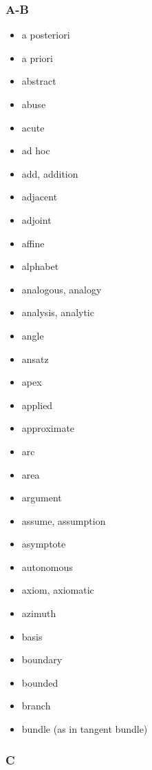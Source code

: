 \documentclass[12pt]{article}
\begin{document}

\subsubsection*{A-B}

\begin{multicols}{3}{
\begin{itemize}
\item a posteriori
\item a priori
\item abstract
\item abuse
\item acute
\item ad hoc
\item add, addition
\item adjacent
\item adjoint
\item affine
\item alphabet
\item analogous, analogy
\item analysis, analytic
\item angle
\item ansatz
\item apex
\item applied
\item approximate
\item arc
\item area
\item argument
\item assume, assumption
\item asymptote
\item autonomous
\item axiom, axiomatic
\item azimuth
\item basis
\item boundary
\item bounded
\item branch
\item bundle (as in tangent bundle)
\end{itemize}
}
\end{multicols}

\subsubsection*{C}
\end{document}
